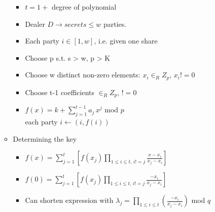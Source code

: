 \begin{itemize}
\begin{itemize}
        \begin{itemize}
        \item $t = 1 +$ degree of polynomial
        \item Dealer $D \rightarrow secrets \le w$ parties.
        \item Each party $i \in [1,w]$, i.e. given one share
        \item Choose p s.t. s > w, p > K
        \item Choose w distinct non-zero elements: $x_i \in_R Z_p$, $x_i != 0$
        \item Choose t-1 coefficients $\in_R Z_p$, $!=0$
        \item $f(x) = k + \sum_{j=1}^{t-1}a_j\,x^j$ mod $p$
            \\each party $i \leftarrow (i, f(i))$
        \end{itemize}
    \item Determining the key
        \begin{itemize}
        \item $f(x) = \sum_{j=1}^t[f(x_j) \prod_{1\le i \le t,\,i != j} \frac{x-x_i}{x_j-x_i}]$
        \item $f(0) = \sum_{j=1}^t[f(x_j) \prod_{1\le i \le t,\,i != j} \frac{-x_i}{x_j-x_i}]$
        \item Can shorten expression with $\lambda_j = \prod_{1 \le i \le t}(\frac{-x_i}{x_j-x_i})$ mod $q$
        \end{itemize}
    \end{itemize}
\end{itemize}